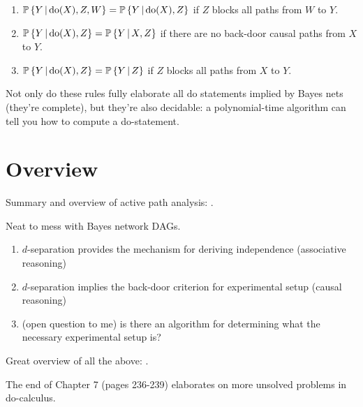 \documentclass{article}
\begin{document}
\begin{enumerate}
\item $\operatorname{\mathbb{P}}\left\{ Y \,\middle|\, \mathrm{do}(X), Z, W \right\}= \operatorname{\mathbb{P}}\left\{ Y \,\middle|\, \mathrm{do}(X), Z \right\}$ if $Z$ blocks all paths from $W$ to $Y$.
\item $\operatorname{\mathbb{P}}\left\{ Y \,\middle|\, \mathrm{do}(X), Z \right\}= \operatorname{\mathbb{P}}\left\{ Y \,\middle|\, X, Z \right\}$ if there are no back-door causal paths from $X$ to $Y$.
\item $\operatorname{\mathbb{P}}\left\{ Y \,\middle|\, \mathrm{do}(X), Z \right\}=\operatorname{\mathbb{P}}\left\{ Y \,\middle|\, Z \right\}$ if $Z$ blocks all paths from $X$ to $Y$.
\end{enumerate}

Not only do these rules fully elaborate all $\mathrm{do}$ statements implied by Bayes nets (they're complete), but they're also decidable: a polynomial-time algorithm can tell you how to compute a do-statement.

\section*{Overview}

Summary and overview of active path analysis: .

Neat  to mess with Bayes network DAGs.

\begin{enumerate}
\item $d$-separation provides the mechanism for deriving independence (associative reasoning)
\item $d$-separation implies the back-door criterion for experimental setup (causal reasoning)
\item (open question to me) is there an algorithm for determining what the necessary experimental setup is?
\end{enumerate}

Great overview of all the above: .

The end of Chapter 7 (pages 236-239) elaborates on more unsolved problems in do-calculus.
\end{document}
